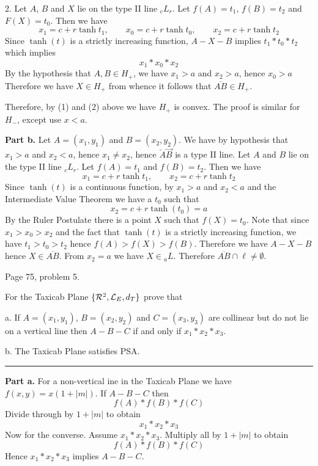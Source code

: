 \medskip
\item{2.} Let $A$, $B$ and $X$ lie on the type II line ${}_cL_r$.
Let $f(A)=t_1$, $f(B)=t_2$ and $F(X)=t_0$. Then we have
$$x_1=c+r\tanh t_1,\qquad x_0=c+r\tanh t_0,\qquad x_2=c+r\tanh t_2$$
Since $\tanh(t)$ is a strictly increasing function, $A{-}X{-}B$ implies $t_1*t_0*t_2$
which implies
$$x_1*x_0*x_2$$
By the hypothesis that $A,B\in H_+$, we have $x_1>a$ and $x_2>a$, hence $x_0>a$
Therefore we have $X\in H_+$ from whence it follows that $\overline{AB}\in H_+$.

\medskip\noindent
Therefore, by (1) and (2) above we have $H_+$ is convex.
The proof is similar for $H_-$, except use $x<a$.

\medskip\noindent
{\bf Part b.} Let $A=(x_1,y_1)$ and $B=(x_2,y_2)$.
We have by hypothesis that $x_1>a$ and $x_2<a$, hence $x_1\ne x_2$, hence
$\overleftarrow A\overrightarrow B$ is a type II line.
Let $A$ and $B$ lie on the type II line ${}_cL_r$.
Let $f(A)=t_1$ and $f(B)=t_2$.
Then we have
$$x_1=c+r\tanh t_1,\qquad x_2=c+r\tanh t_2$$
Since $\tanh(t)$ is a continuous function, by $x_1>a$ and $x_2<a$ and the
Intermediate Value Theorem we have a $t_0$ such that
$$x_2=c+r\tanh(t_0)=a$$
By the Ruler Postulate there is a point $X$ such that $f(X)=t_0$.
Note that since $x_1>x_0>x_2$ and the fact that $\tanh(t)$ is a strictly increasing function,
we have $t_1>t_0>t_2$ hence $f(A)>f(X)>f(B)$.
Therefore we have $A{-}X{-}B$ hence $X\in\overline{AB}$.
From $x_2=a$ we have $X\in{}_aL$.
Therefore $\overline{AB}\cap\ell\ne\emptyset$.











\vfill
\eject

\beginsection Page 75, problem 5.

For the Taxicab Plane $\{{\cal R}^2,{\cal L}_E,d_T\}$ prove that
\item{a.} If $A=(x_1,y_1)$, $B=(x_2,y_2)$ and $C=(x_3,y_3)$ are collinear but do not
lie on a vertical line then $A{-}B{-}C$ if and only if $x_1*x_2*x_3$.
\item{b.} The Taxicab Plane satisfies PSA.
\medskip
\hrule

\bigskip\noindent
{\bf Part a.} For a non-vertical ine in the Taxicab Plane we have $f(x,y)=x(1+|m|)$.
If $A{-}B{-}C$ then
$$f(A)*f(B)*f(C)$$
Divide through by $1+|m|$ to obtain
$$x_1*x_2*x_3$$
Now for the converse. Assume $x_1*x_2*x_3$.
Multiply all by $1+|m|$ to obtain
$$f(A)*f(B)*f(C)$$
Hence $x_1*x_2*x_3$ implies $A{-}B{-}C$.

